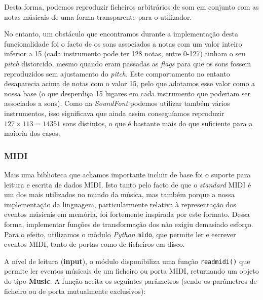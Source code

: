 Desta forma, podemos reproduzir ficheiros arbitrários de som em conjunto com as notas músicais de uma forma transparente para o utilizador.

No entanto, um obstáculo que encontramos durante a implementação desta funcionalidade foi o facto de os sons associados a notas com um valor inteiro inferior a 15 (cada instrumento pode ter 128 notas, entre 0-127) tinham o seu \textit{pitch} distorcido, mesmo quando eram passadas as \textit{flags} para que os sons fossem reproduzidos sem ajustamento do \textit{pitch}. Este comportamento no entanto desaparecia acima de notas com o valor 15, pelo que adotamos esse valor como a nossa base (o que desperdiça 15 lugares em cada instrumento que poderiam ser associados a sons). Como na \textit{SoundFont} podemos utilizar também vários instrumentos, isso significava que ainda assim conseguíamos reproduzir $127 \times 113 = 14351$ sons distintos, o que é bastante mais do que suficiente para a maioria dos casos.

\subsubsection{MIDI}
Mais uma biblioteca que achamos importante incluir de base foi o suporte para leitura e escrita de dados MIDI. Isto tanto pelo facto de que o \textit{standard} MIDI é um dos mais utilizados no mundo da música, mas também porque a nossa implementação da linguagem, particularmente relativa à representação dos eventos músicais em memória, foi fortemente inspirada por este formato. Dessa forma, implementar funções de transformação dos não exigiu demasiado esforço. Para o efeito, utilizamos o módulo \textit{Python} \texttt{mido}, que permite ler e escrever eventos MIDI, tanto de portas como de ficheiros em disco.

A nível de leitura (\textbf{input}), o módulo disponibiliza uma função \texttt{readmidi()} que permite ler eventos músicais de um ficheiro ou porta MIDI, returnando um objeto do tipo \textbf{Music}. A função aceita os seguintes parâmetros (sendo os parâmetros de ficheiro ou de porta mutualmente exclusivos):

